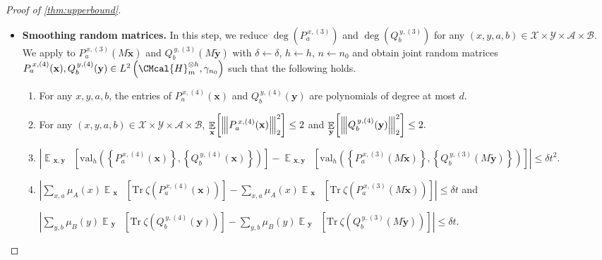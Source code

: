 \documentclass[10pt,a4paper]{article}
\def\H{\CMcal{H}}
\theoremstyle{plain}
\theoremstyle{definition}
\newcommand {\minusspace} {\: \! \!}
\newcommand {\Fn} [2] {\ensuremath{ #1 \minusspace \Br{ #2 } }}
\newcommand {\set} [1] {\ensuremath{ \left\lbrace #1 \right\rbrace }}
\newcommand {\br} [1] {\ensuremath{ \left( #1 \right) }}
\newcommand {\Br} [1] {\ensuremath{ \left[ #1 \right] }}
\newcommand {\ab} [1] {\ensuremath{ \left| #1 \right| }}
\DeclareMathOperator*{\bigE}{\mathbb{E}}
\newcommand {\expec} [2] {\Fn{\bigE_{\substack{#1}}}{#2}}
\newcommand{\nnorm}[1]{{\left\vert\kern-0.25ex\left\vert\kern-0.25ex\left\vert #1
		\right\vert\kern-0.25ex\right\vert\kern-0.25ex\right\vert}}
\newcommand {\Tr} {\ensuremath{ \mathrm{Tr} }}
\newcommand {\id} {\ensuremath{\mathds{1}}}
\newcommand{\randg}{\ensuremath{\mathbf{g}}}
\newcommand{\randh}{\ensuremath{\mathbf{h}}}
\newcommand{\randx}{\ensuremath{\mathbf{x}}}
\newcommand{\randy}{\ensuremath{\mathbf{y}}}
\newcommand{\herspace}[1]{\ensuremath{\H_m^{\otimes #1}}}
\newcommand{\gval}[3]{\ensuremath{\mathrm{val}_{#1}\br{\set{#2},\set{#3}}}}
\newcommand{\fourtuples}{\ensuremath{\br{x,y,a,b}\in\calX\times\calY\times\calA\times\calB}}
\newcommand{\Pnn}[1] {\ensuremath{{P^{\,x, (#1)}_a}}}
\newcommand{\Qnn}[1] {\ensuremath{{Q^{\,y, (#1)}_b}}}
\newcommand{\calX}{\mathcal{X}}
\newcommand{\calY}{\mathcal{Y}}
\newcommand{\calA}{\mathcal{A}}
\newcommand{\calB}{\mathcal{B}}
\newcommand{\1}{\mathbb{1}} %
\begin{document}
\begin{proof}[Proof of \cref{thm:upperbound}]
\begin{itemize}
\begin{enumerate}
\item $\displaystyle\sum_{x,a}\mu_A(x)\expec{ \randx}{\Tr~\zeta\br{\Pnn{3}(M\tilde{\randx})}}\leq6\sum_{x,a}\mu_A(x)\expec{\randg}{\Tr~\zeta\br{\Pnn{2}(\randg)}}$ \quad and

$\displaystyle\sum_{y,b}\mu_B(y)\expec{ \randy}{\Tr~\zeta\br{\Qnn{3}(M\tilde{\randy})}}\leq6\sum_{y,b}\mu_B(y)\expec{\randh}{\Tr~\zeta\br{\Qnn{2}(\randh)}}.$

\item For any $x,y$, $\displaystyle\sum_{a\in\calA}\Pnn{3}(M\tilde{\randx})=\sum_{b\in\calB}\Qnn{3}(M\tilde{\randy})=\id.$
\end{enumerate}
Here $n_0=\frac{d^{O(d)}s^{12}t^{12}}{\delta^6}$. Therefore, there must exist  an $M$ such that all the above four requirements hold. We will use this fixed M throughout the rest of the proof. 

\item \textbf{Smoothing random matrices.} 
In this step, we reduce $\deg(\Pnn{3})$ and $\deg(\Qnn{3})$ for any \fourtuples. We apply \cite[Lemma 12.1]{qin2021nonlocal} to $\Pnn{3}(M\tilde{\randx})$ and $\Qnn{3}(M\tilde{\randy})$ with $\delta\gets\delta$, $h\gets h$, $n\gets n_0$ and obtain joint random matrices $\Pnn{4}(\randx),\Qnn{4}(\randy)\in L^2\br{\herspace{h},\gamma_{n_0}}$ such that the following holds.
\begin{enumerate}
\item For any $x,y,a,b$, the entries of $\Pnn{4}(\randx)$ and $\Qnn{4}(\randy)$ are polynomials of degree at most $d$.
						
\item For any \fourtuples, $\displaystyle\expec{\randx}{\nnorm{\Pnn{4}(\randx)}_2^2}\leq2$ and
$\displaystyle\expec{\randy}{\nnorm{\Qnn{4}(\randy)}_2^2}\leq2.$

\item $\displaystyle\ab{\expec{\randx,\randy}{\gval{h}{\Pnn{4}(\randx)}{\Qnn{4}(\randx)}}-\expec{\randx,\randy}{\gval{h}{\Pnn{3}(M\tilde{\randx})}{\Qnn{3}(M\tilde{\randy})}}}\leq \delta t^2.$

\item $\displaystyle\ab{\sum_{x,a}\mu_A(x)\expec{\randx}{\Tr~\zeta\br{\Pnn{4}(\randx)}}-\sum_{x,a}\mu_A(x)\expec{ \randx}{\Tr~\zeta\br{\Pnn{3}(M\tilde{\randx})}}}\leq\delta t$ \quad and

$\displaystyle\ab{\sum_{y,b}\mu_B(y)\expec{\randy}{\Tr~\zeta\br{\Qnn{4}(\randy)}}-\sum_{y,b}\mu_B(y)\expec{ \randy}{\Tr~\zeta\br{\Qnn{3}(M\tilde{\randy})}}}\leq\delta t.$


\end{enumerate}
\end{itemize}
\end{proof}
\end{document}
